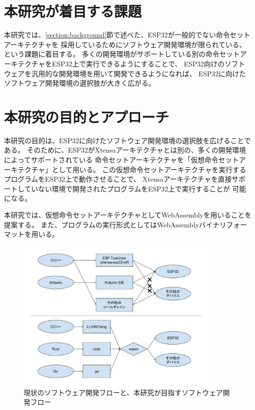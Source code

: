 \section{本研究が着目する課題}

本研究では、\ref{section:background}節で述べた、ESP32が一般的でない命令セットアーキテクチャを
採用しているためにソフトウェア開発環境が限られている、という課題に着目する。
多くの開発環境がサポートしている別の命令セットアーキテクチャをESP32上で実行できるようにすることで、
ESP32向けのソフトウェアを汎用的な開発環境を用いて開発できるようになれば、
ESP32に向けたソフトウェア開発環境の選択肢が大きく広がる。

\section{本研究の目的とアプローチ}

本研究の目的は、ESP32に向けたソフトウェア開発環境の選択肢を広げることである。
そのために、ESP32がXtensaアーキテクチャとは別の、多くの開発環境によってサポートされている
命令セットアーキテクチャを「仮想命令セットアーキテクチャ」として用いる。
この仮想命令セットアーキテクチャを実行するプログラムをESP32上で動作させることで、
Xtensaアーキテクチャを直接サポートしていない環境で開発されたプログラムをESP32上で実行することが
可能になる。

本研究では、仮想命令セットアーキテクチャとしてWebAssemblyを用いることを提案する。
また、プログラムの実行形式としてはWebAssemblyバイナリフォーマットを用いる。

\begin{figure}[htbp]
  \caption{現状のソフトウェア開発フローと、本研究が目指すソフトウェア開発フロー}
  \label{fig:new_world}
  \begin{center}
    \includegraphics[bb=0 0 800 600,width=10cm]{img/new_world.pdf}
  \end{center}
\end{figure}

